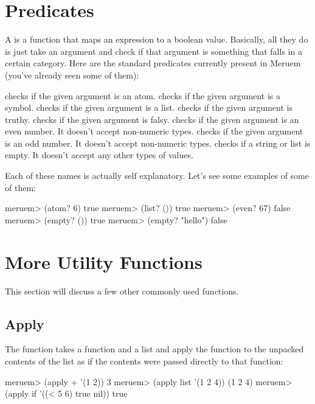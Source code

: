\section{Predicates}
A  is a function that maps an expression to a boolean value. Basically, all they do is just take an argument and check if that argument is something that falls in a certain category. Here are the standard predicates currently present in Meruem (you've already seen some of them):

\begin{description}
	 checks if the given argument is an atom.
	 checks if the given argument is a symbol.
	 checks if the given argument is a list.
	 checks if the given argument is truthy.
	 checks if the given argument is falsy.
	 checks if the given argument is an even number. It doesn't accept non-numeric types.
	 checks if the given argument is an odd number. It doesn't accept non-numeric types.
	 checks if a string or list is empty. It doesn't accept any other types of values.
\end{description}

Each of these names is actually self explanatory. Let's see some examples of some of them:

\begin{REPL}
meruem> (atom? 6)
true
meruem> (list? ())
true
meruem> (even? 67)
false
meruem> (empty? ())
true
meruem> (empty? "hello")
false
\end{REPL}

\section{More Utility Functions}
This section will discuss a few other commonly used functions.

\subsection{Apply}
The  function takes a function and a list and apply the function to the unpacked contents of the list as if the contents were passed directly to that function:

\begin{REPL}
meruem> (apply + '(1 2))
3
meruem> (apply list '(1 2 4))
(1 2 4)
meruem> (apply if '((< 5 6) true nil))
true
\end{REPL}

